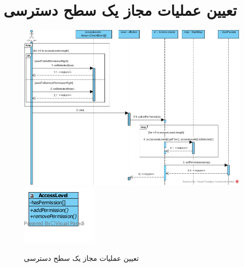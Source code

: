 \section{تعیین عملیات مجاز یک سطح دسترسی}
\begin{figure}[H]
	\centering
	\includegraphics[scale=0.7]{img/sequence-design/SetPermissions}
	\includegraphics[scale=0.8]{img/sequence-design/SetPermissionsC}
	\caption{تعیین عملیات مجاز یک سطح دسترسی}
\end{figure}


